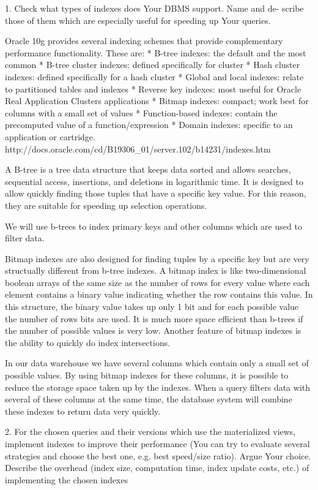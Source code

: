 1. Check what types of indexes does Your DBMS support. Name and de-
scribe those of them which are especially useful for speeding up Your
queries.

Oracle 10g provides several indexing schemes that provide complementary performance functionality. These are:
* B-tree indexes: the default and the most common
* B-tree cluster indexes: defined specifically for cluster
* Hash cluster indexes: defined specifically for a hash cluster
* Global and local indexes: relate to partitioned tables and indexes
* Reverse key indexes: most useful for Oracle Real Application Clusters applications
* Bitmap indexes: compact; work best for columns with a small set of values
* Function-based indexes: contain the precomputed value of a function/expression
* Domain indexes: specific to an application or cartridge.
http://docs.oracle.com/cd/B19306_01/server.102/b14231/indexes.htm

A B-tree is a tree data structure that keeps data sorted and allows searches, sequential access, insertions, and deletions in logarithmic time. It is designed to allow quickly finding those tuples that have a specific key value. For this reason, they are suitable for speeding up selection operations. 

We will use b-trees to index primary keys and other columns which are used to filter data.

Bitmap indexes are also designed for finding tuples by a specific key but are very structually different from b-tree indexes. A bitmap index is like two-dimensional boolean arrays of the same size as the number of rows for every value where each element contains a binary value indicating whether the row contains this value. In this structure, the binary value takes up only 1 bit and for each possible value the number of rows bits are used. It is much more space efficient than b-trees if the number of possible values is very low. Another feature of bitmap indexes is the ability to quickly do index intersections.

In our data warehouse we have several columns which contain only a small set of possible values. By using bitmap indexes for these columns, it is possible to reduce the storage space taken up by the indexes. When a query filters data with several of these columns at the same time, the database system will combine these indexes to return data very quickly.


2. For the chosen queries and their versions which use the materialized views,
implement indexes to improve their performance (You can try to evaluate
several strategies and choose the best one, e.g. best speed/size ratio).
Argue Your choice. Describe the overhead (index size, computation time,
index update costs, etc.) of implementing the chosen indexes

